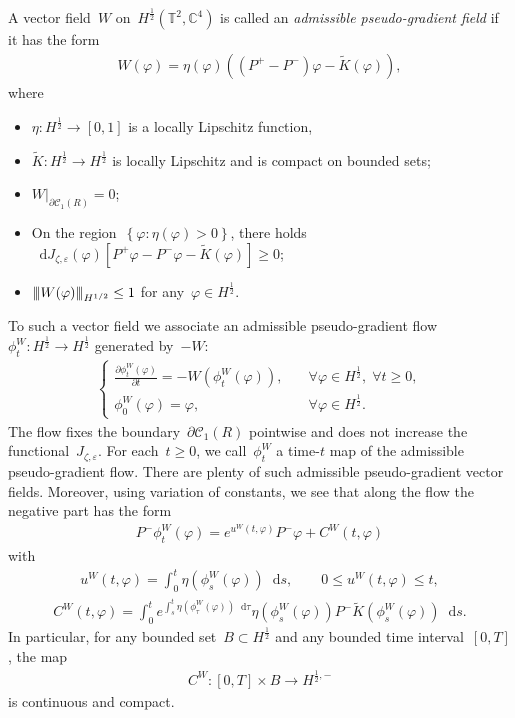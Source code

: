 \documentclass[10pt,a4paper]{amsart}
\newcommand{\tnorm}[1]{%
  \left\vert\kern-0.3ex\left\vert\kern-0.3ex\left\vert #1 \right\vert\kern-0.3ex\right\vert\kern-0.3ex\right\vert
}
\newcommand{\p}{\partial}
\newcommand{\C}{\mathbb{C}}
\newcommand{\dd}{\mathop{}\!\mathrm{d}}
\newcommand{\eps}{\varepsilon}
\newcommand{\parenthesis}[1]{\left(#1\right)} %
\newcommand{\braces}[1]{\left\{#1\right\}} %
\begin{document}
A vector field~$W$ on~$H^{\frac{1}{2}}(\mathbb{T}^2,\C^4)$ is called an \emph{admissible pseudo-gradient field} if it has the form 
\begin{align}
    W(\varphi)= \eta(\varphi) \parenthesis{ (P^+ -P^- )\varphi - \widetilde{K}(\varphi)},
\end{align}
where
\begin{itemize}
    \item[(W1)] $\eta\colon H^{\frac{1}{2}}\to [0,1]$ is a locally Lipschitz function,
    \item[(W2)] $\widetilde{K}\colon H^{\frac{1}{2}}\to H^{\frac{1}{2}}$ is locally Lipschitz and is compact on bounded sets;
    \item[(W3)] $W|_{\p\mathscr{C}_1(R)} = 0$;
    \item[(W4)] On the region~$\braces{\varphi\colon \eta(\varphi)>0}$, there holds~$\dd J_{\zeta,\eps}(\varphi)[P^+\varphi -P^- \varphi -\widetilde{K}(\varphi)]\geq 0$;
    \item[(W5)] $\tnorm{W(\varphi)}_{H^{1/2}} \leq 1$ for any~$\varphi\in H^{\frac{1}{2}}$. 
\end{itemize}
To such a vector field we associate an admissible pseudo-gradient flow~$\phi^W_t\colon H^{\frac{1}{2}}\to H^{\frac{1}{2}}$ generated by~$-W$: 
\begin{align}
    \begin{cases}
        \frac{\p\phi^W_t(\varphi)}{\p t} = - W(\phi^W_t(\varphi)), & \quad \forall \varphi \in H^{\frac{1}{2}}, \; \forall t\geq 0, \\
        \phi^W_0(\varphi)=\varphi, & \quad \forall \varphi\in H^{\frac{1}{2}}.
    \end{cases}
\end{align}
The flow fixes the boundary~$\p\mathscr{C}_1(R)$ pointwise and does not increase the functional~$J_{\zeta,\eps}$.  
For each~$t\geq 0$, we call~$\phi^W_t$ a time-$t$ map of the admissible pseudo-gradient flow. 
There are plenty of such admissible pseudo-gradient vector fields. 
Moreover, using variation of constants, we see that along the flow the negative part has the form
\begin{align}
    P^-\phi^W_t(\varphi)
    = e^{u^W(t,\varphi)}P^-\varphi + C^W(t,\varphi)
\end{align}
with 
\begin{align}
    u^W(t,\varphi)=\int_0^t \eta(\phi^W_s(\varphi))\dd s, \qquad  0\leq u^W(t,\varphi)\leq t ,
\end{align}
\begin{align}
    C^W(t,\varphi)
    = \int_0^t e^{\int_s^t \eta(\phi^W_\tau(\varphi))\dd \tau } \eta(\phi^W_s(\varphi))P^-\widetilde{K}(\phi^W_s(\varphi))\dd{s}. 
\end{align}
In particular, for any bounded set~$B\subset H^{\frac{1}{2}}$ and any bounded time interval~$[0,T]$, the map 
\begin{align}
    C^W\colon [0,T]\times B \to H^{\frac{1}{2},-}
\end{align}
is continuous and compact.
\end{document}
